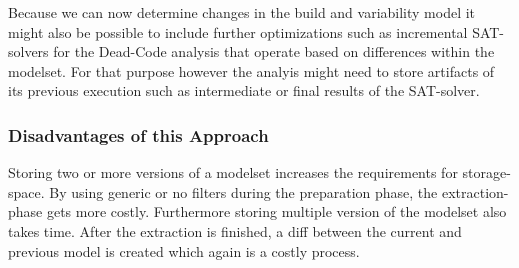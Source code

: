 \documentclass[a4paper]{article}
\begin{document}
Because we can now determine changes in the build and variability model it might also be possible to include further optimizations such as incremental SAT-solvers for the Dead-Code analysis that operate based on differences within the modelset. For that purpose however the analyis might need to store artifacts of its previous execution such as intermediate or final results of the SAT-solver.

\subsubsection{Disadvantages of this Approach}

Storing two or more versions of a modelset increases the requirements for storage-space. By using generic or no filters during the preparation phase, the extraction-phase gets more costly. Furthermore storing multiple version of the modelset also takes time. After the extraction is finished, a diff between the current and previous model is created which again is a costly process.

\newpage

\end{document}
